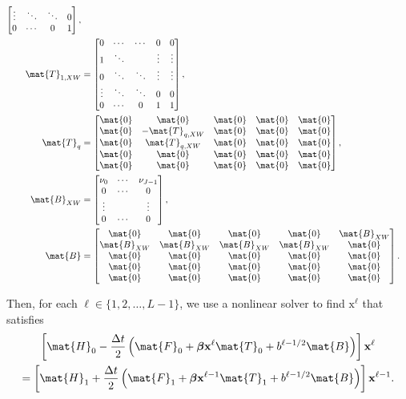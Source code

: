 \documentclass{jpmarticle}
\renewcommand{\vec}[1]{\boldsymbol{\mathrm{#1}}}
\let\subequationsorig\subequations%
\let\endsubequationsorig\endsubequations%
\renewenvironment{subequations}{
  \subequationsorig
  \renewcommand{\theequation}{\theparentequation.\arabic{equation}}
}{
  \endsubequationsorig
}
\begin{document}
\begin{subequations}
\begin{align}
\begin{bmatrix}
      \vdots & \ddots & \ddots & 0
      \\
      0 & \cdots & 0 & 1
    \end{bmatrix},
    \\
    \mat{T}_{1, XW} &=
    \begin{bmatrix}
      0 & \cdots & \cdots & 0 & 0
      \\
      1 & \ddots & & \vdots & \vdots
      \\
      0 & \ddots & \ddots & \vdots & \vdots
      \\
      \vdots & \ddots & \ddots & 0 & 0
      \\
      0 & \cdots & 0 & 1 & 1
    \end{bmatrix},
    \\
    \mat{T}_q &=
    \begin{bmatrix}
      \mat{0} & \mat{0} & \mat{0} & \mat{0} & \mat{0}
      \\
      \mat{0} & - \mat{T}_{q, XW} & \mat{0} & \mat{0} & \mat{0}
      \\
      \mat{0} & \mat{T}_{q, XW} & \mat{0} & \mat{0} & \mat{0}
      \\
      \mat{0} & \mat{0} & \mat{0} & \mat{0} & \mat{0}
      \\
      \mat{0} & \mat{0} & \mat{0} & \mat{0} & \mat{0}
    \end{bmatrix},
    \\
    \mat{B}_{XW} &=
    \begin{bmatrix}
      \nu_0 & \cdots & \nu_{J - 1} \\
      0 & \cdots & 0 \\
      \vdots & & \vdots \\
      0 & \cdots & 0
    \end{bmatrix},
    \\
    \mat{B} &=
    \begin{bmatrix}
      \mat{0} & \mat{0} & \mat{0} & \mat{0} & \mat{B}_{XW}
      \\
      \mat{B}_{XW} & \mat{B}_{XW} & \mat{B}_{XW} & \mat{B}_{XW} & \mat{0}
      \\
      \mat{0} & \mat{0} & \mat{0} & \mat{0} & \mat{0}
      \\
      \mat{0} & \mat{0} & \mat{0} & \mat{0} & \mat{0}
      \\
      \mat{0} & \mat{0} & \mat{0} & \mat{0} & \mat{0}
    \end{bmatrix}.
  \end{align}
\end{subequations}
Then, for each $\ell \in \{1, 2, \ldots, L - 1\}$,
we use a nonlinear solver to find $\vec{x}^{\ell}$ that satisfies
\begin{multline}
  \left[
    \mat{H}_0
    - \frac{\Delta t}{2}
    \left(
      \mat{F}_0
      + \vec{\beta} \vec{x}^{\ell} \mat{T}_0
      + b^{\ell - 1 / 2} \mat{B}
    \right)
  \right] \vec{x}^{\ell}
  \\
  = \left[
    \mat{H}_1
    + \frac{\Delta t}{2}
    \left(
      \mat{F}_1
      + \vec{\beta} \vec{x}^{\ell - 1} \mat{T}_1
      + b^{\ell - 1 / 2} \mat{B}
    \right)
  \right] \vec{x}^{\ell - 1}.
\end{multline}
\end{document}
